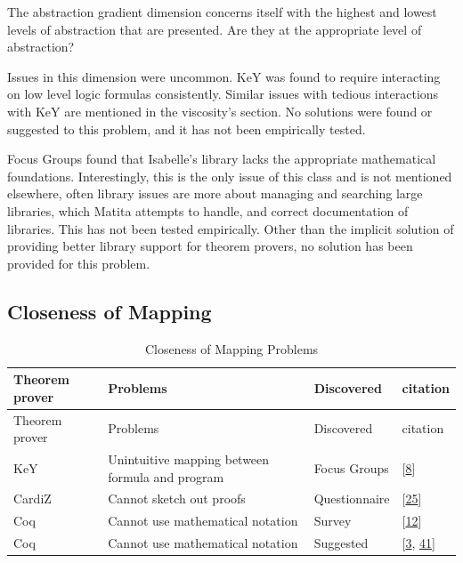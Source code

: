 \documentclass[
]{article}
\begin{document}
The abstraction gradient dimension concerns itself with the highest and
lowest levels of abstraction that are presented. Are they at the
appropriate level of abstraction?

Issues in this dimension were uncommon. KeY was found to require
interacting on low level logic formulas consistently. Similar issues
with tedious interactions with KeY are mentioned in the viscosity's
section. No solutions were found or suggested to this problem, and it
has not been empirically tested.

Focus Groups found that Isabelle's library lacks the appropriate
mathematical foundations. Interestingly, this is the only issue of this
class and is not mentioned elsewhere, often library issues are more
about managing and searching large libraries, which Matita attempts to
handle, and correct documentation of libraries. This has not been tested
empirically. Other than the implicit solution of providing better
library support for theorem provers, no solution has been provided for
this problem.

\hypertarget{closeness-of-mapping-1}{%
\subsection{Closeness of Mapping}\label{closeness-of-mapping-1}}

\hypertarget{tbl:closeness_of_mapping}{}
\begin{longtable}[]{@{}llll@{}}
\caption{\label{tbl:closeness_of_mapping}Closeness of Mapping
Problems}\tabularnewline
\toprule
Theorem prover & Problems & Discovered & citation \\
\midrule
\endfirsthead
\toprule
Theorem prover & Problems & Discovered & citation \\
\midrule
\endhead
KeY & Unintuitive mapping between formula and program & Focus Groups &
{[}\protect\hyperlink{ref-beckert_usability_2015}{8}{]} \\
CardiZ & Cannot sketch out proofs & Questionnaire &
{[}\protect\hyperlink{ref-kadoda_cognitive_2000}{25}{]} \\
Coq & Cannot use mathematical notation & Survey &
{[}\protect\hyperlink{ref-berman_development_2014}{12}{]} \\
Coq & Cannot use mathematical notation & Suggested &
{[}\protect\hyperlink{ref-asperti_user_2007}{3},
\protect\hyperlink{ref-zacchiroli_user_2007}{41}{]} \\
\bottomrule
\end{longtable}
\end{document}
